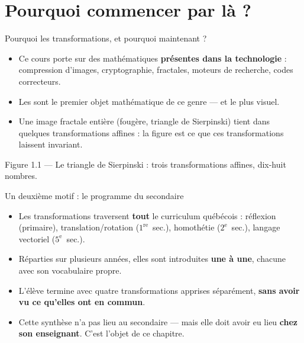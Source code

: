 \section{Pourquoi commencer par là ?}

\begin{frame}{Pourquoi les transformations, et pourquoi maintenant ?}
  \small
  \begin{itemize}
    \item Ce cours porte sur des mathématiques \textbf{présentes dans la
      technologie} : compression d'images, cryptographie, fractales,
      moteurs de recherche, codes correcteurs.
    \item Les  sont le premier objet
      mathématique de ce genre --- et le plus visuel.
    \item Une image fractale entière (fougère, triangle de Sierpinski)
      tient dans quelques transformations affines : la figure est ce
      que ces transformations laissent invariant.
  \end{itemize}
  \begin{center}\small Figure 1.1 --- Le triangle de Sierpinski : trois
  transformations affines, dix-huit nombres.\end{center}
\end{frame}

\begin{frame}{Un deuxième motif : le programme du secondaire}
  \begin{itemize}
    \item Les transformations traversent \textbf{tout} le curriculum
      québécois : réflexion (primaire), translation/rotation
      ($1^{\text{re}}$~sec.), homothétie ($2^{\text{e}}$~sec.), langage
      vectoriel ($5^{\text{e}}$~sec.).
    \item Réparties sur plusieurs années, elles sont introduites
      \textbf{une à une}, chacune avec son vocabulaire propre.
    \item L'élève termine avec quatre transformations apprises
      séparément, \textbf{sans avoir vu ce qu'elles ont en commun}.
    \item Cette synthèse n'a pas lieu au secondaire --- mais elle doit
      avoir eu lieu \textbf{chez son enseignant}. C'est l'objet de ce
      chapitre.
  \end{itemize}
\end{frame}

